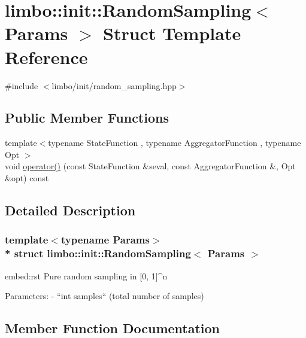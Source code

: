 \hypertarget{structlimbo_1_1init_1_1_random_sampling}{}\section{limbo\+:\+:init\+:\+:Random\+Sampling$<$ Params $>$ Struct Template Reference}
\label{structlimbo_1_1init_1_1_random_sampling}


{\ttfamily \#include $<$limbo/init/random\+\_\+sampling.\+hpp$>$}

\subsection*{Public Member Functions}
\begin{DoxyCompactItemize}
\item 
{\footnotesize template$<$typename State\+Function , typename Aggregator\+Function , typename Opt $>$ }\\void \hyperlink{structlimbo_1_1init_1_1_random_sampling_a4173b31aa6453a68f43aa7d24fbd0ca9}{operator()} (const State\+Function \&seval, const Aggregator\+Function \&, Opt \&opt) const 
\end{DoxyCompactItemize}


\subsection{Detailed Description}
\subsubsection*{template$<$typename Params$>$\\*
struct limbo\+::init\+::\+Random\+Sampling$<$ Params $>$}

\begin{DoxyVerb}embed:rst
Pure random sampling in [0, 1]^n

Parameters:
  - ``int samples`` (total number of samples)
\end{DoxyVerb}
 

\subsection{Member Function Documentation}
